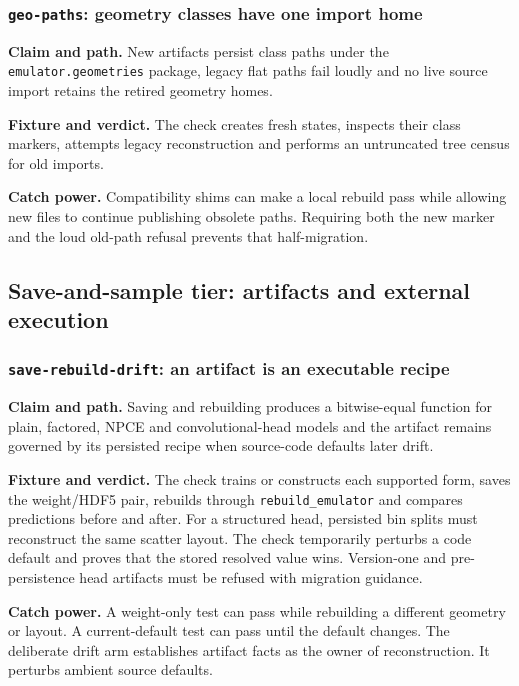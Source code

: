 \documentclass[10pt,aps,prd,twocolumn,nofootinbib]{revtex4-2}
\newcommand{\code}[1]{\texttt{#1}}
\begin{document}
\subsubsection{\code{geo-paths}: geometry classes have one import home}

\textbf{Claim and path.}  New artifacts persist class paths under the
\code{emulator.geometries} package, legacy flat paths fail loudly and no live
source import retains the retired geometry homes.

\textbf{Fixture and verdict.}  The check creates fresh states, inspects their
class markers, attempts legacy reconstruction and performs an untruncated
tree census for old imports.

\textbf{Catch power.}  Compatibility shims can make a local rebuild pass while
allowing new files to continue publishing obsolete paths.  Requiring both the
new marker and the loud old-path refusal prevents that half-migration.

\subsection{Save-and-sample tier: artifacts and external execution}

\subsubsection{\code{save-rebuild-drift}: an artifact is an executable recipe}

\textbf{Claim and path.}  Saving and rebuilding produces a bitwise-equal
function for plain, factored, NPCE and convolutional-head models and the
artifact remains governed by its persisted recipe when source-code defaults
later drift.

\textbf{Fixture and verdict.}  The check trains or constructs each supported
form, saves the weight/HDF5 pair, rebuilds through
\code{rebuild\_emulator} and compares predictions before and after.  For a
structured head, persisted bin splits must reconstruct the same scatter
layout.  The check temporarily perturbs a code default and proves that the
stored resolved value wins.  Version-one and pre-persistence head artifacts
must be refused with migration guidance.

\textbf{Catch power.}  A weight-only test can pass while rebuilding a
different geometry or layout.  A current-default test can pass until the
default changes.  The deliberate drift arm establishes artifact facts as the
owner of reconstruction.  It perturbs ambient source defaults.
\end{document}
